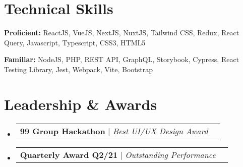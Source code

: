 \documentclass[a4paper, 11pt]{article}
\makeatletter
\newcommand{\resumeProjectHeading}[2]{
    \item
    \begin{tabular*}{0.987\textwidth}{l@{\extracolsep{\fill}}r}
      \small#1\\
    \end{tabular*}\vspace{-7pt}
}
\newcommand{\resumeSubHeadingListStart}{\begin{itemize}[leftmargin=0.1in, label={}]}
\newcommand{\resumeSubHeadingListEnd}{\end{itemize}\vspace{5pt}}
\makeatother
\begin{document}
\section{Technical Skills}
    \resumeSubHeadingListStart
        \small{
            \item \textbf{Proficient:} ReactJS, VueJS, NextJS, NuxtJS, Tailwind CSS, Redux, React Query, Javascript, Typescript, CSS3, HTML5
            \item \textbf{Familiar:} NodeJS, PHP, REST API, GraphQL, Storybook, Cypress, React Testing Library, Jest, Webpack, Vite, Bootstrap
        }
    \resumeSubHeadingListEnd

\section{Leadership \& Awards}
    \resumeSubHeadingListStart
        \resumeProjectHeading
            {\textbf{99 Group Hackathon} $|$ \emph{Best UI/UX Design Award}}{2021}
        \resumeProjectHeading
            {\textbf{Quarterly Award Q2/21} $|$ \emph{Outstanding Performance}}{2021}
    \resumeSubHeadingListEnd
\end{document}

